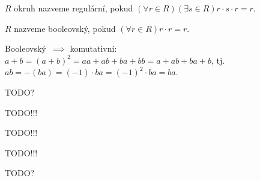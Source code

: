 \documentclass[12pt]{article}					%
\begin{document}
\begin{definice}
	$R$ okruh nazveme regulární, pokud $(\forall r \in R)(\exists s \in R) r·s·r = r$.

	$R$ nazveme booleovský, pokud $(\forall r \in R) r·r = r$.

	\begin{priklad}
		Booleovský $\implies$ komutativní: $a + b = (a + b)^2 = aa + ab + ba + bb = a + ab + ba + b$, tj. $ab = -(ba) = (-1)·ba = (-1)^2·ba = ba$.
	\end{priklad}
\end{definice}

TODO?


TODO!!!


TODO!!!


TODO!!!


TODO?
\end{document}
